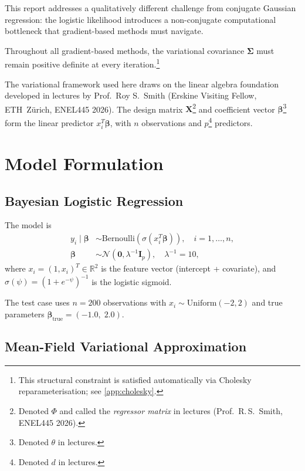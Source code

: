 \documentclass[11pt,a4paper]{article}
\newcommand{\R}{\mathbb{R}}
\newcommand{\N}{\mathcal{N}}
\begin{document}
This report addresses a qualitatively different challenge from conjugate Gaussian
regression: the logistic likelihood introduces a non-conjugate computational bottleneck
that gradient-based methods must navigate.

Throughout all gradient-based methods, the variational covariance $\bm{\Sigma}$ must
remain positive definite at every iteration.\footnote{This structural constraint is satisfied automatically
via Cholesky reparameterisation; see \ref{app:cholesky}.}

The variational framework used here draws on the linear algebra foundation developed
in lectures by Prof.\ Roy S.\ Smith (Erskine Visiting Fellow, ETH~Z\"{u}rich, ENEL445 2026).
The design matrix $\bm{X}$\footnote{Denoted $\Phi$ and called the
\emph{regressor matrix} in lectures (Prof.\ R.\,S.\ Smith, ENEL445 2026).} and coefficient
vector $\bm{\beta}$\footnote{Denoted $\theta$ in lectures.} form the linear predictor
$x_i^T\bm{\beta}$, with $n$ observations and $p$\footnote{Denoted $d$ in lectures.}
predictors.

\section{Model Formulation}

\subsection{Bayesian Logistic Regression}

The model is
\begin{align}
  y_i \mid \bm{\beta} &\sim \mathrm{Bernoulli}(\sigma(x_i^T\bm{\beta})), \quad i=1,\ldots,n,\\
  \bm{\beta} &\sim \N(\bm{0}, \lambda^{-1}\bm{I}_p), \quad \lambda^{-1}=10,
\end{align}
where $x_i = (1, x_i)^T \in \R^2$ is the feature vector (intercept + covariate),
and $\sigma(\psi) = (1+e^{-\psi})^{-1}$ is the logistic sigmoid.

The test case uses $n=200$ observations with $x_i \sim \mathrm{Uniform}(-2,2)$ and
true parameters $\bm{\beta}_{\mathrm{true}} = (-1.0,\; 2.0)$.

\subsection{Mean-Field Variational Approximation}
\end{document}
